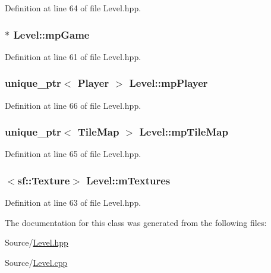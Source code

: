 Definition at line 64 of file Level.\-hpp.

\hypertarget{class_level_a21c456b270db451d1da365d37e365b32}{
\subsubsection[{mp\-Game}]{$\ast$ Level\-::mp\-Game\hspace{0.3cm}{\ttfamily [protected]}}}\label{class_level_a21c456b270db451d1da365d37e365b32}


Definition at line 61 of file Level.\-hpp.

\hypertarget{class_level_a1cb20848f0e9d49a6469b4682e105d94}{
\subsubsection[{mp\-Player}]{\setlength{\rightskip}{0pt plus 5cm}unique\-\_\-ptr$<$ {\bf Player} $>$ Level\-::mp\-Player\hspace{0.3cm}{\ttfamily [protected]}}}\label{class_level_a1cb20848f0e9d49a6469b4682e105d94}


Definition at line 66 of file Level.\-hpp.

\hypertarget{class_level_a2294842a4de2c0fbe9b28a670088b5c4}{
\subsubsection[{mp\-Tile\-Map}]{\setlength{\rightskip}{0pt plus 5cm}unique\-\_\-ptr$<$ {\bf Tile\-Map} $>$ Level\-::mp\-Tile\-Map\hspace{0.3cm}{\ttfamily [protected]}}}\label{class_level_a2294842a4de2c0fbe9b28a670088b5c4}


Definition at line 65 of file Level.\-hpp.

\hypertarget{class_level_a17bf54432fa53317ab5d7ffffbfdec6f}{
\subsubsection[{m\-Textures}]{$<$sf\-::\-Texture$>$ Level\-::m\-Textures\hspace{0.3cm}{\ttfamily [protected]}}}\label{class_level_a17bf54432fa53317ab5d7ffffbfdec6f}


Definition at line 63 of file Level.\-hpp.



The documentation for this class was generated from the following files\-:\begin{DoxyCompactItemize}
\item 
Source/\hyperlink{_level_8hpp}{Level.\-hpp}\item 
Source/\hyperlink{_level_8cpp}{Level.\-cpp}\end{DoxyCompactItemize}
